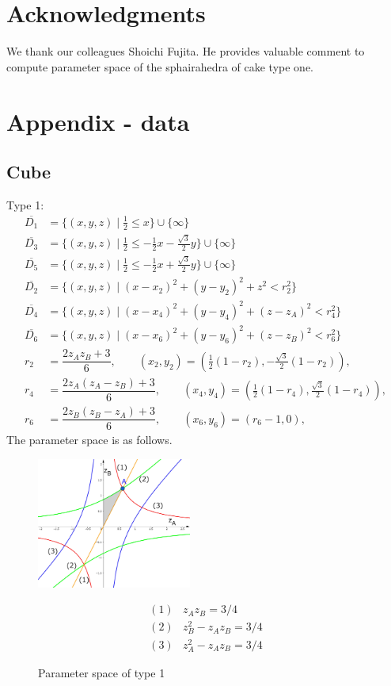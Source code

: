 \documentclass[suppldata, dvipdfmx]{interact}
\theoremstyle{plain}%
\theoremstyle{definition}
\theoremstyle{remark}
\theoremstyle{problemstyle}
\begin{document}
\section{Acknowledgments}
We thank our colleagues Shoichi Fujita.
He provides valuable comment to compute parameter space of the
sphairahedra of cake type one.

\section{Appendix - data}

\subsection{Cube}
Type 1:
\begin{align*}
\overline{D_1}&= \{ (x,y,z) \mid \frac{1}{2} \le x \} \cup \{ \infty \}\\
\overline{D_3}&=\{(x,y,z) \mid \frac{1}{2} \le -\frac{1}{2}x-\frac{\sqrt{3}}{2}y \} \cup\{\infty\}\\
\overline{D_5}&=\{(x,y,z) \mid \frac{1}{2} \le -\frac{1}{2}x+\frac{\sqrt{3}}{2}y \} \cup\{\infty\}\\
\overline{D_2}&=\{(x,y,z) \mid (x-x_2)^2+(y-y_2)^2+z^2<r_2^2 \} \\
\overline{D_4}&=\{(x,y,z) \mid (x-x_4)^2+(y-y_4)^2+(z-z_A)^2<r_4^2 \} \\
\overline{D_6}&=\{(x,y,z) \mid (x-x_6)^2+(y-y_6)^2+(z-z_B)^2<r_6^2 \} \\
 r_2 &= \dfrac{2z_Az_B + 3}{6}, \qquad
(x_2, y_2) = \left(\frac{1}{2}(1-r_2), -\frac{\sqrt{3}}{2}(1-r_2)\right),\\
 r_4 &= \dfrac{2z_A(z_A-z_B) + 3}{6}, \qquad
(x_4, y_4) = \left(\frac{1}{2}(1-r_4), \frac{\sqrt{3}}{2}(1-r_4)\right),\\
 r_6 &= \dfrac{2z_B(z_B-z_A) + 3}{6}, \qquad
(x_6, y_6) = \left(r_6-1, 0\right),
\end{align*} 
The parameter space is as follows.
\begin{figure}[h]
 \begin{minipage}[]{0.5\textwidth}
 \centering
 \includegraphics[width=2in,
 keepaspectratio]{./img/graph/cubeALimit.jpg}
 \caption{Parameter space of type 1}
 \end{minipage}
 \hspace*{\fill}
 \begin{minipage}[]{0.5\textwidth}
  \centering
\begin{align*}
(1)& z_Az_B = 3/4\\
(2)& z_B^2 - z_A z_B = 3/4\\
(3)& z_A^2 - z_A z_B = 3/4
\end{align*}
 \end{minipage}
\end{figure}
\end{document}
